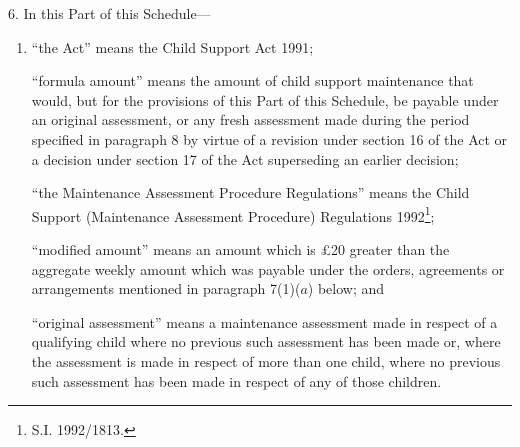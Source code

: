 \documentclass[12pt,a4paper]{article}
\begin{document}
\renewcommand\parthead{--- Schedule Part II}

6.  In this Part of this Schedule—
\begin{enumerate}\item[]
“the Act” means the Child Support Act 1991;

“formula amount” means the amount of child support maintenance that would, but for the provisions of this Part of this Schedule, be payable under an original assessment, or any fresh assessment made during the period specified in paragraph 8 
by virtue of a revision under section 16 of the Act or a decision under section 17 of the Act superseding an earlier decision;  %

“the Maintenance Assessment Procedure Regulations” means the Child Support (Maintenance Assessment Procedure) Regulations 1992\footnote{\frenchspacing S.I. 1992/1813.};

“modified amount” means an amount which is £20 greater than the aggregate weekly amount which was payable under the orders, agreements or arrangements mentioned in paragraph 7(1)($a$) below; and

“original assessment” means a maintenance assessment made in respect of a qualifying child where no previous such assessment has been made or, where the assessment is made in respect of more than one child, where no previous such assessment has been made in respect of any of those children.
\end{enumerate}


\medskip
\end{document}
